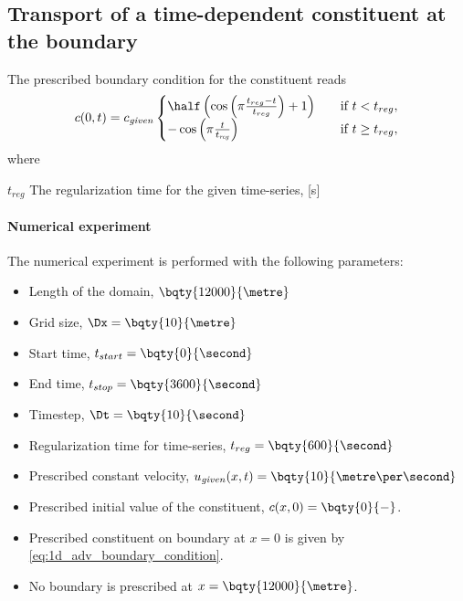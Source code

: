 \subsection{Transport of a time-dependent constituent at the boundary}
\label{sec:numerical_experiment_1d_adv_time_dependent_boundary}
The prescribed boundary condition for the constituent reads
\begin{align}
    c(0,t) = c_{\it given}
    \begin{cases}
        \half \left(\cos\left(\pi \frac{t_{reg} - t}{t_{reg}}\right) + 1  \right) &\quad \text{if } t < t_{reg},
        \\
        -\cos\left(\pi \frac{t}{t_{\it reg}} \right) &\quad \text{if } t \geq t_{reg},
    \end{cases}
    \label{eq:1d_adv_sine_boundary_condition}
\end{align}
where
\begin{symbollist}
    \item[$t_{reg}$] The regularization time for the given time-series, [\si{\second}]
\end{symbollist}
\paragraph*{Numerical experiment}
The numerical experiment is performed with the following parameters:
\begin{itemize}
    \item Length of the domain, $\bqty{12000}{\metre}$
    \item Grid size, $\Dx = \bqty{10}{\metre}$
    \item Start time, $t_{start} = \bqty{0}{\second}$
    \item End time, $t_{stop} = \bqty{3600}{\second}$
    \item Timestep, $\Dt = \bqty{10}{\second}$
    \item Regularization time for time-series, $t_{reg} = \bqty{600}{\second}$
    \item Prescribed constant velocity, $u_{\it given}(x,t) = \bqty{10}{\metre\per\second}$
    \item Prescribed initial value of the constituent, $c(x,0)= \bqty{0}{-}$.
    \item Prescribed constituent on boundary at $x=0$ is given by \autoref{eq:1d_adv_boundary_condition}.
    \item No boundary is prescribed at $x=\bqty{12000}{\metre}$.
\end{itemize}
